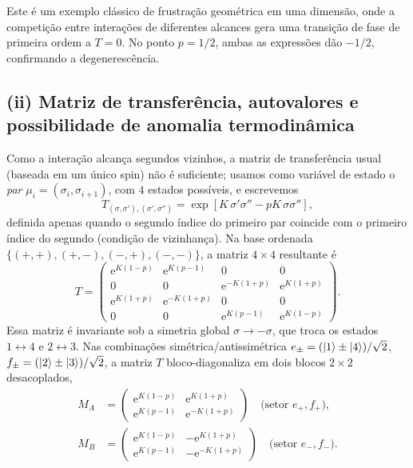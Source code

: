 \documentclass[11pt,a4paper]{article}
\newcommand{\e}[1]{\mathrm{e}^{#1}}
\begin{document}
%
Este é um exemplo clássico de frustração geométrica em uma dimensão, onde a competição entre interações de diferentes alcances gera uma transição de fase de primeira ordem a \(T=0\).
%
No ponto \(p = 1/2\), ambas as expressões dão \(-1/2\), confirmando a degenerescência.
%
\subsection*{(ii) Matriz de transferência, autovalores e possibilidade de anomalia termodinâmica}
%
Como a interação alcança segundos vizinhos, a matriz de transferência usual (baseada em um único spin) não é suficiente; usamos como variável de estado o \emph{par} $\mu_i=(\sigma_i,\sigma_{i+1})$, com $4$ estados possíveis, e escrevemos
%
\begin{equation}
    T_{(\sigma,\sigma'),(\sigma',\sigma'')}=\exp\left[K\,\sigma'\sigma''-pK\,\sigma\sigma''\right],
\end{equation}
%
definida apenas quando o segundo índice do primeiro par coincide com o primeiro índice do segundo (condição de vizinhança). Na base ordenada $\{(+,+),(+,-),(-,+),(-,-)\}$, a matriz $4\times4$ resultante é
%
\begin{equation}
    T=
    \begin{pmatrix}
        \e{K(1-p)} & \e{K(p-1)} & 0 & 0\\
        0 & 0 & \e{-K(1+p)} & \e{K(1+p)}\\
        \e{K(1+p)} & \e{-K(1+p)} & 0 & 0\\
        0 & 0 & \e{K(p-1)} & \e{K(1-p)}
    \end{pmatrix}.
    \label{eq:T_annni}
\end{equation}
%
Essa matriz é invariante sob a simetria global $\sigma\to-\sigma$, que troca os estados $1\leftrightarrow4$ e $2\leftrightarrow3$. Nas combinações simétrica/antissimétrica $e_\pm=(\ket1\pm\ket4)/\sqrt2$, $f_\pm=(\ket2\pm\ket3)/\sqrt2$, a matriz $T$ bloco-diagonaliza em dois blocos $2\times2$ desacoplados,
%
\begin{align}
    M_A&=
    \begin{pmatrix}
        \e{K(1-p)} & \e{K(1+p)}\\
        \e{K(p-1)} & \e{-K(1+p)}
    \end{pmatrix}
    \quad\text{(setor }e_+,f_+\text{)},
    \\[4pt]
    M_B&=
    \begin{pmatrix}
        \e{K(1-p)} & -\e{K(1+p)}\\
        \e{K(p-1)} & -\e{-K(1+p)}
    \end{pmatrix}
    \quad\text{(setor }e_-,f_-\text{)}.
\end{align}
\end{document}
